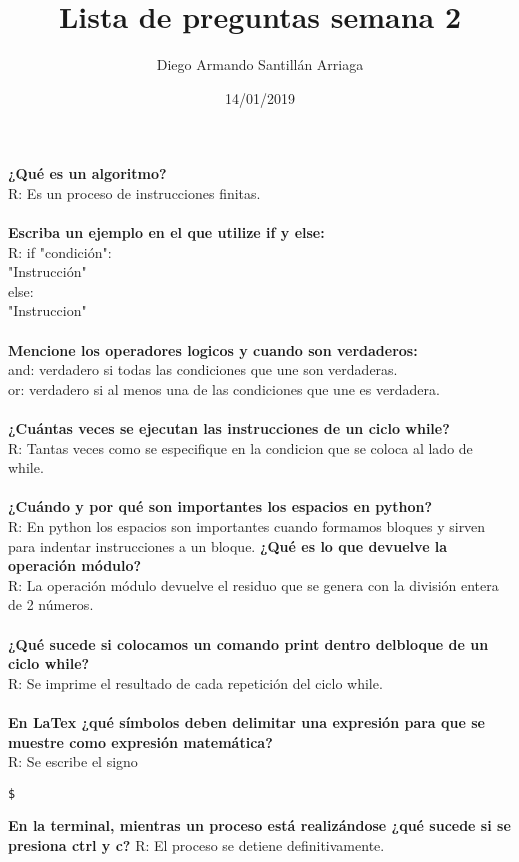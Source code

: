 \documentclass[letter paper, 12pt, oneside]{article}
\title{\Huge Lista de preguntas semana 2}
\author{Diego Armando Santillán Arriaga}
\date{14/01/2019}
\begin{document}
	\maketitle
	\newpage
	\textbf{¿Qué es un algoritmo?}
	\\
	R: Es un proceso de instrucciones finitas.
	\\\\
	\textbf{Escriba un ejemplo en el que utilize if y else:}
	\\
	R: if "condición":
	\\
	"Instrucción"
	\\
	else:
	\\"Instruccion"
\\\\	
	\textbf{Mencione los operadores logicos y cuando son verdaderos:}
\\
and: verdadero si todas las condiciones que une son verdaderas.
\\
or: verdadero si al menos una de las condiciones que une es verdadera. 
\\\\
\textbf{¿Cuántas veces se ejecutan las instrucciones de un ciclo while?}
\\
R: Tantas veces como se especifique en la condicion que se coloca al lado de while. 
\\\\
\textbf{¿Cuándo y por qué son importantes los espacios en python?}
\\
R: En python los espacios son importantes cuando formamos bloques y sirven para indentar instrucciones a un bloque.
\textbf{¿Qué es lo que devuelve la operación módulo?}
\\
R: La operación módulo devuelve el residuo que se genera con la división entera de 2 números. 
\\\\
\textbf{¿Qué sucede si colocamos un comando print dentro delbloque de un ciclo while?}
\\
R: Se imprime el resultado de cada repetición del ciclo while. 
\\\\
\textbf{En LaTex ¿qué símbolos deben delimitar una expresión para que se muestre como expresión matemática?}  
\\
R: Se escribe el signo \begin{verbatim}
$
\end{verbatim}
\textbf{En la terminal, mientras un proceso está realizándose ¿qué sucede si se presiona ctrl y c?}
R: El proceso se detiene definitivamente.
\end{document}
